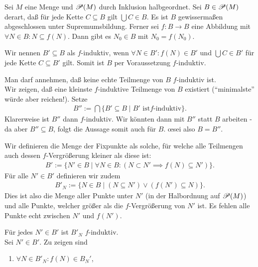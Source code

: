 \documentclass[../../main.tex]{subfiles}
\begin{document}
\begin{lem}\label{12.2.6} 
	Sei $M$ eine Menge und $\mathcal P(M)$ durch Inklusion halbgeordnet. Sei $B\in\mathcal P(M)$ derart, daß für jede Kette $C\subseteq B$ gilt $\bigcup C\in B$. Es ist $B$ gewissermaßen abgeschlossen unter Supremumsbildung. Ferner sei $f: B\rightarrow B$ eine Abbildung mit $\forall N\in B: N\subseteq f(N)$. Dann gibt es $N_0\in B$ mit $N_0=f(N_0)$.
\end{lem}
\begin{cproof}
	Wir nennen $B'\subseteq B$ als $f$-induktiv, wenn $\forall N\in B': f(N)\in B'$ und $\bigcup C\in B'$ für jede Kette $C\subseteq B'$ gilt. Somit ist $B$ per Voraussetzung $f$-induktiv.\\	
	\begin{behbox}
		\hbeh{}
			Man darf annehmen, daß keine echte Teilmenge von $B$ $f$-induktiv ist. \\
		\hbeg{}
			Wir zeigen, daß eine kleinste $f$-induktive Teilmenge von $B$ existiert (\enquote{minimalste} würde aber reichen!). Setze
			\begin{align*}
				B'':=\bigcap\{B'\subseteq B\mid B'\text{ ist}f\text{-induktiv}\}.
			\end{align*}
			Klarerweise ist $B''$ dann $f$-induktiv. Wir könnten dann mit $B''$ statt $B$ arbeiten - da aber $B''\subseteq B$, folgt die Aussage somit auch für $B$. \oe sei also $B=B''$.
	\end{behbox}
	\noindent Wir definieren die Menge der Fixpunkte als  solche, für welche alle Teilmengen auch dessen $f$-Vergrößerung kleiner als diese ist:
	\begin{align*}
		B':=\{N'\in B\mid \forall N\in B: (N\subset N'\implies f(N)\subseteq N')\}.
	\end{align*}
	Für alle $N'\in B'$ definieren wir zudem
	\begin{align*}
		B'_N:=\{N\in B\mid(N\subseteq N')\lor(f(N')\subseteq N)\}.
	\end{align*}
	Dies ist also die Menge aller Punkte unter $N'$ (in der Halbordnung auf $\mathcal P(M)$) und alle Punkte, welcher größer als die $f$-Vergrößerung von $N'$ ist. Es fehlen alle Punkte echt zwischen $N'$ und $f(N')$.
	\schritt{2}
	\begin{behbox}
		\hbeh{}
			Für jedes $N'\in B'$ ist $B'_N$ $f$-induktiv. \\
		\hbeg{}
			Sei $N'\in B'$. Zu zeigen sind
			\begin{enumerate}[\normalfont(b)]
				\item $\forall N\in B'_N: f(N)\in B_N'$,

\end{enumerate}
\end{behbox}
\end{cproof}
\end{document}

